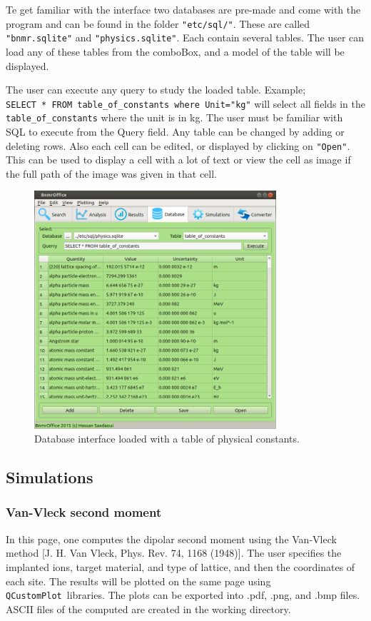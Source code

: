 \documentclass[10pt,letterpaper,oneside]{article}
\newcommand{\qcp}{\texttt{QCustomPlot}}
\begin{document}
Te get familiar with the interface two databases are pre-made and come with the program and can be found in the folder \verb+"etc/sql/"+. These are called \verb+"bnmr.sqlite"+ and \verb+"physics.sqlite"+. Each contain several tables. The user can load any of these tables from the comboBox, and a model of the table will be displayed. 

The user can execute any query to study the loaded table. Example;\\ \verb+SELECT * FROM table_of_constants where Unit="kg"+ will select all fields in the \verb+table_of_constants+ where the unit is in kg. The user must be familiar with SQL to execute from the Query field. Any table can be changed by adding or deleting rows. Also each cell can be edited, or displayed by clicking on \verb+"Open"+. This can be used to display a cell with a lot of text or view the cell as image if the full path of the image was given in that cell. 
\begin{figure}[h]
\center
\includegraphics[width=0.8\textwidth]{database1.png}
 \caption{Database interface loaded with a table of physical constants.}
 \label{fig-mag}
 \end{figure}

 \clearpage
\subsection{Simulations}
\subsubsection{Van-Vleck second moment}
In this page, one computes the dipolar second moment using the Van-Vleck method [J. H. Van Vleck, Phys. Rev. 74, 1168 (1948)]. The user specifies the implanted ions, target material, and type of lattice, and then the coordinates of each site. The results will be plotted on the same page using \qcp\ libraries. The plots can be exported into .pdf, .png, and .bmp files. ASCII files of the computed are created in the working directory.
\end{document}

